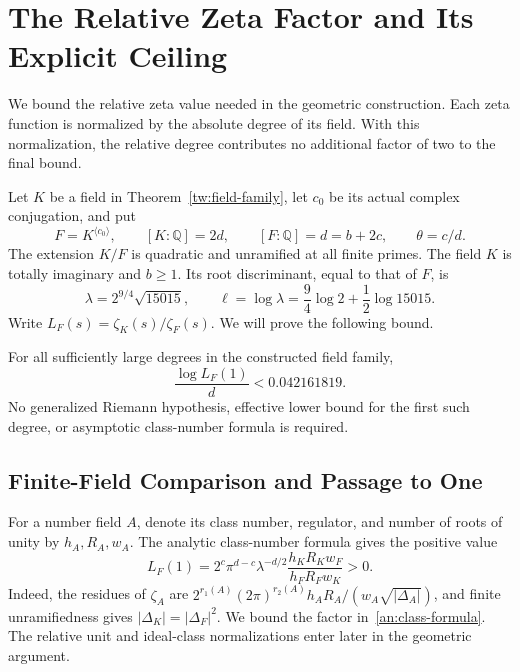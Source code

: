 \section{The Relative Zeta Factor and Its Explicit Ceiling}
\label{an:section}

We bound the relative zeta value needed in the geometric construction.
Each zeta function is normalized by the absolute degree of its field.
With this normalization, the relative degree contributes no additional
factor of two to the final bound.

Let $K$ be a field in Theorem~\ref{tw:field-family}, let $c_0$ be its
actual complex conjugation, and put
\[
 F=K^{\langle c_0\rangle},\qquad [K:\mathbb Q]=2d,\qquad
 [F:\mathbb Q]=d=b+2c,\qquad \theta=c/d.
\]
The extension $K/F$ is quadratic and unramified at all finite primes.
The field $K$ is totally imaginary and $b\geq1$. Its root discriminant, equal to
that of $F$, is
\[
 \lambda=2^{9/4}\sqrt{15015},\qquad
 \ell=\log\lambda=\frac94\log2+\frac12\log15015.
\]
Write $L_F(s)=\zeta_K(s)/\zeta_F(s)$. We will prove the following bound.

\begin{theorem}\label{an:ceiling}
For all sufficiently large degrees in the constructed field family,
\[
 \frac{\log L_F(1)}d<0.042161819.
\]
No generalized Riemann hypothesis, effective lower bound for the first
such degree, or asymptotic class-number formula is required.
\end{theorem}

\subsection{Finite-Field Comparison and Passage to One}

For a number field $A$, denote its class number, regulator, and number
of roots of unity by $h_A,R_A,w_A$. The analytic class-number formula
gives the positive value
\begin{equation}\label{an:class-formula}
 L_F(1)=2^c\pi^{d-c}\lambda^{-d/2}
       \frac{h_KR_Kw_F}{h_FR_Fw_K}>0.
\end{equation}
Indeed, the residues of $\zeta_A$ are
$2^{r_1(A)}(2\pi)^{r_2(A)}h_AR_A/(w_A\sqrt{|\Delta_A|})$,
and finite unramifiedness gives $|\Delta_K|=|\Delta_F|^2$.
We bound the factor in~\eqref{an:class-formula}. The relative unit and
ideal-class normalizations enter later in the geometric argument.

